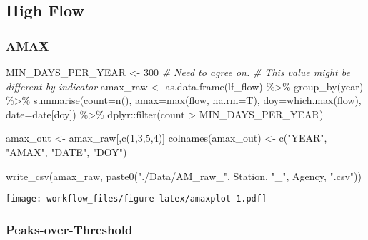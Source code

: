 \documentclass[
]{article}
\newenvironment{Shaded}{\begin{snugshade}}{\end{snugshade}}
\newcommand{\AttributeTok}[1]{\textcolor[rgb]{0.77,0.63,0.00}{#1}}
\newcommand{\CommentTok}[1]{\textcolor[rgb]{0.56,0.35,0.01}{\textit{#1}}}
\newcommand{\DecValTok}[1]{\textcolor[rgb]{0.00,0.00,0.81}{#1}}
\newcommand{\FunctionTok}[1]{\textcolor[rgb]{0.00,0.00,0.00}{#1}}
\newcommand{\NormalTok}[1]{#1}
\newcommand{\OtherTok}[1]{\textcolor[rgb]{0.56,0.35,0.01}{#1}}
\newcommand{\SpecialCharTok}[1]{\textcolor[rgb]{0.00,0.00,0.00}{#1}}
\newcommand{\StringTok}[1]{\textcolor[rgb]{0.31,0.60,0.02}{#1}}
\begin{document}
\hypertarget{high-flow}{%
\subsection{High Flow}\label{high-flow}}

\hypertarget{amax}{%
\subsubsection{AMAX}\label{amax}}

\begin{Shaded}
\begin{Highlighting}[]
\NormalTok{MIN\_DAYS\_PER\_YEAR }\OtherTok{\textless{}{-}} \DecValTok{300} \CommentTok{\# Need to agree on.}
\CommentTok{\# This value might be different by indicator}
\NormalTok{amax\_raw }\OtherTok{\textless{}{-}} \FunctionTok{as.data.frame}\NormalTok{(lf\_flow) }\SpecialCharTok{\%\textgreater{}\%}
  \FunctionTok{group\_by}\NormalTok{(year) }\SpecialCharTok{\%\textgreater{}\%}
  \FunctionTok{summarise}\NormalTok{(}\AttributeTok{count=}\FunctionTok{n}\NormalTok{(), }\AttributeTok{amax=}\FunctionTok{max}\NormalTok{(flow, }\AttributeTok{na.rm=}\NormalTok{T),}
            \AttributeTok{doy=}\FunctionTok{which.max}\NormalTok{(flow), }\AttributeTok{date=}\NormalTok{date[doy]) }\SpecialCharTok{\%\textgreater{}\%} 
\NormalTok{  dplyr}\SpecialCharTok{::}\FunctionTok{filter}\NormalTok{(count }\SpecialCharTok{\textgreater{}}\NormalTok{ MIN\_DAYS\_PER\_YEAR)}

\NormalTok{amax\_out }\OtherTok{\textless{}{-}}\NormalTok{ amax\_raw[,}\FunctionTok{c}\NormalTok{(}\DecValTok{1}\NormalTok{,}\DecValTok{3}\NormalTok{,}\DecValTok{5}\NormalTok{,}\DecValTok{4}\NormalTok{)]}
\FunctionTok{colnames}\NormalTok{(amax\_out) }\OtherTok{\textless{}{-}} \FunctionTok{c}\NormalTok{(}\StringTok{"YEAR"}\NormalTok{, }\StringTok{"AMAX"}\NormalTok{, }\StringTok{"DATE"}\NormalTok{, }\StringTok{"DOY"}\NormalTok{)}

\FunctionTok{write\_csv}\NormalTok{(amax\_raw, }\FunctionTok{paste0}\NormalTok{(}\StringTok{"./Data/AM\_raw\_"}\NormalTok{, Station, }\StringTok{"\_"}\NormalTok{, Agency, }\StringTok{".csv"}\NormalTok{))}
\end{Highlighting}
\end{Shaded}

\texttt{[image: workflow\_files/figure-latex/amaxplot-1.pdf]}

\hypertarget{peaks-over-threshold}{%
\subsubsection{Peaks-over-Threshold}\label{peaks-over-threshold}}
\end{document}
